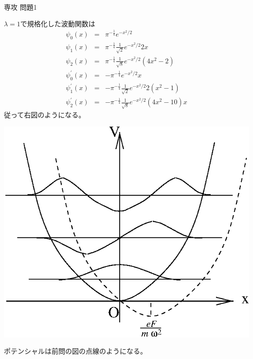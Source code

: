 \documentclass[fleqn]{jbook}
\begin{document}
\begin{answer}{専攻 問題1}{}
\begin{subanswers}
\begin{subsubanswers}
  \SubSubAnswer
    \parbox[t]{72mm}{
    $\lambda=1$で規格化した波動関数は
%
    \begin{eqnarray*}
      \psi_0(x) &=&%
        {\pi}^{-\frac{1}{4}} e^{-x^2/2} \\
      \psi_1(x) &=&%
        {\pi}^{-\frac{1}{4}}\frac{1}{\sqrt{2}} e^{-x^2/2} 2x \\
      \psi_2(x) &=&%
        {\pi}^{-\frac{1}{4}}\frac{1}{\sqrt{8}} e^{-x^2/2}(4x^2-2) \\[3mm]
      \psi_0^{\prime}(x) &=&%
       -{\pi}^{-\frac{1}{4}} e^{-x^2/2} x \\
      \psi_1^{\prime}(x) &=&%
       -{\pi}^{-\frac{1}{4}}\frac{1}{\sqrt{2}}e^{-x^2/2}2(x^2-1) \\
      \psi_2^{\prime}(x) &=&%
       -{\pi}^{-\frac{1}{4}}\frac{1}{\sqrt{8}}e^{-x^2/2}(4x^2-10)x
    \end{eqnarray*}
%
    従って右図のようになる。
    }\parbox[t]{82mm}{\vspace*{-10mm}
    \begin{center}
      \mbox{\includegraphics[clip]{1993phy1-1.eps}}
    \end{center}}

  \end{subsubanswers}


\SubAnswer
  \begin{subsubanswers}
  \SubSubAnswer
    ポテンシャルは前問の図の点線のようになる。


\end{subsubanswers}
\end{subanswers}
\end{answer}
\end{document}
